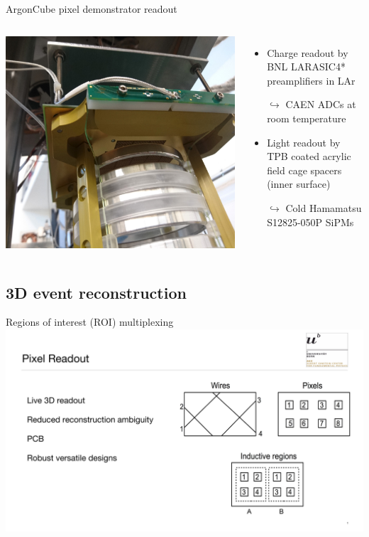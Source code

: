 \documentclass[]{beamer}
\newcommand*{\emphcol}{red}
\newcommand*{\AC}{{ArgonCube}}
\begin{document}
\begin{frame}{\AC{} pixel demonstrator readout}
	\begin{columns}[c]
		\centering
		\includegraphics[width=\textwidth]{viper/viper_sipm}
		\begin{itemize}
			\item {\color{\emphcol} Charge readout by BNL LARASIC4* preamplifiers in LAr}
			\item[$\hookrightarrow$] CAEN ADCs at room temperature
			\item Light readout by TPB coated acrylic field cage spacers (inner surface)
			\item[$\hookrightarrow$] {\color{\emphcol} Cold Hamamatsu S12825-050P SiPMs}
		\end{itemize}
	\end{columns}
\end{frame}

\subsection{3D event reconstruction}

\begin{frame}{Regions of interest (ROI) multiplexing}
	\centering
	\includegraphics[page=2, viewport=20 0 1770 845, clip, width=\textwidth]{defence/Pixels}
\end{frame}
\end{document}
